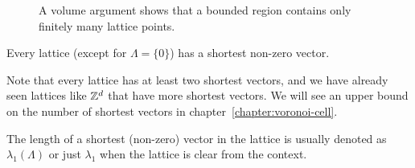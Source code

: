 \begin{figure}
  \begin{center}
  \end{center}
  \caption{A volume argument shows that a bounded region contains only finitely many lattice points.}
  \label{fig:finitely-many-points-in-bounded-region}
\end{figure}

\begin{corollary}
  Every lattice (except for $\Lambda = \{ 0 \}$) has a shortest non-zero vector.
\end{corollary}

Note that every lattice has at least two shortest vectors,
and we have already seen lattices like $\mathbb{Z}^d$ that have more shortest vectors.
We will see an upper bound on the number of shortest vectors in chapter~\ref{chapter:voronoi-cell}.

\begin{notation}
  The length of a shortest (non-zero) vector in the lattice is usually denoted as $\lambda_1(\Lambda)$
  or just $\lambda_1$ when the lattice is clear from the context.
\end{notation}



